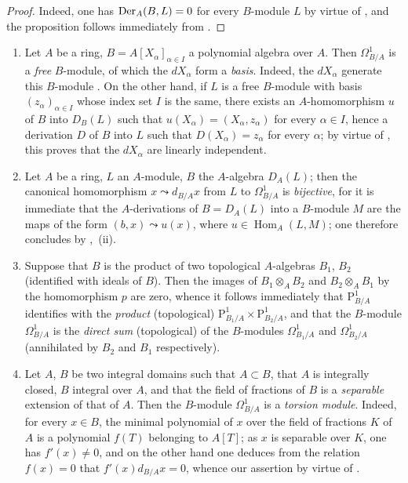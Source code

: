 \begin{proof}
Indeed, one has $\operatorname{Der}_A(B,L)=0$ for every $B$-module $L$ by virtue of , and the proposition follows immediately from .
\end{proof}

\begin{examples}[20.4.13]
\label{0.20.4.13}
\begin{enumerate}
  \item[\rm(i)] Let $A$ be a ring, $B=A[X_\alpha]_{\alpha\in I}$ a polynomial algebra over $A$.
Then $\Omega^1_{B/A}$ is a \emph{free} $B$-module, of which the $dX_\alpha$ form a \emph{basis}.
Indeed, the $dX_\alpha$ generate this $B$-module .
On the other hand, if $L$ is a free $B$-module with basis $(z_\alpha)_{\alpha\in I}$ whose index set $I$ is the same, there exists an $A$-homomorphism $u$ of $B$ into $D_B(L)$ such that $u(X_\alpha)=(X_\alpha,z_\alpha)$ for every $\alpha\in I$, hence  a derivation $D$ of $B$ into $L$ such that $D(X_\alpha)=z_\alpha$ for every $\alpha$; by virtue of , this proves that the $dX_\alpha$ are linearly independent.
  \item[\rm(ii)] Let $A$ be a ring, $L$ an $A$-module, $B$ the
  $A$-algebra $D_A(L)$; then the canonical homomorphism
  $x\leadsto d_{B/A}x$ from $L$ to $\Omega^1_{B/A}$ is \emph{bijective}, for
  it is immediate that the $A$-derivations of $B=D_A(L)$ into a $B$-module
  $M$ are the maps of the form $(b,x)\leadsto u(x)$, where
  $u\in\operatorname{Hom}_A(L,M)$; one therefore concludes by
  ,~(ii).
  \item[\rm(iii)] Suppose that $B$ is the product of two topological $A$-algebras $B_1$, $B_2$ (identified with ideals of $B$).
Then the images of $B_1\otimes_A B_2$ and $B_2\otimes_A B_1$ by the homomorphism $p$  are zero, whence it follows immediately that $\mathrm{P}^1_{B/A}$ identifies with the \emph{product} (topological) $\mathrm{P}^1_{B_1/A}\times\mathrm{P}^1_{B_2/A}$, and that the $B$-module $\Omega^1_{B/A}$ is the \emph{direct sum} (topological) of the $B$-modules $\Omega^1_{B_1/A}$ and $\Omega^1_{B_2/A}$ (annihilated by $B_2$ and $B_1$ respectively).
  \item[\rm(iv)] Let $A$, $B$ be two integral domains such that $A\subset B$, that $A$ is integrally closed, $B$ integral over $A$, and that the field of fractions of $B$ is a \emph{separable} extension of that of $A$.
Then the $B$-module $\Omega^1_{B/A}$ is a \emph{torsion module}.
Indeed, for every $x\in B$, the minimal polynomial of $x$ over the field of fractions $K$ of $A$ is a polynomial $f(T)$ belonging to $A[T]$; as $x$ is separable over $K$, one has $f'(x)\neq 0$, and on the other hand one deduces from the relation $f(x)=0$ that $f'(x)d_{B/A}x=0$, whence our assertion by virtue of .
\end{enumerate}
\end{examples}


